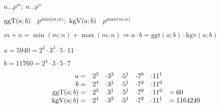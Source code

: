 $a \dots p^m;\ a \dots p^n$

$\ggt(a;b)\quad p^{\min(m;n)};\ \kgv(a;b)\quad p^{\max(m;n)}$

$m + n = \min(m;n) + \max(m;n) \Rightarrow a \cdot b = \textrm{ggt}(a;b) \cdot \textrm{kgv}(a;b)$

$a = 5940 = 2^2 \cdot 3^3 \cdot 5 \cdot 11$

$b = 11760 = 2^4 \cdot 3 \cdot 5 \cdot 7$

\[\begin{array}{rcccccl}
          a = & 2^2 & \cdot 3^3 & \cdot 5^1 & \cdot 7^0 & \cdot 11^1 \\
          b = & 2^4 & \cdot 3^1 & \cdot 5^1 & \cdot 7^2 & \cdot 11^0 \\
          \operatorname{ggT}(a;b) = & 2^2 & \cdot 3^1 & \cdot 5^1 & \cdot 7^0 & \cdot 11^0 & = 60      \\
          \operatorname{kgV}(a;b) = & 2^4 & \cdot 3^3 & \cdot 5^1 & \cdot 7^2 & \cdot 11^1 & = 1164240
\end{array}\]
